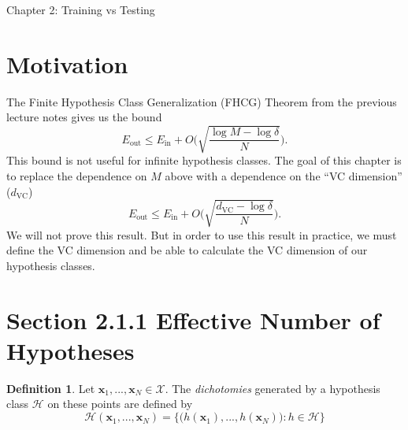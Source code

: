 \documentclass[10pt]{exam}
\theoremstyle{definition}
\newtheorem{defn}{Definition}
\newcommand{\Ein}{E_{\text{in}}}
\newcommand{\Eout}{E_{\text{out}}}
\newcommand{\x}{\mathbf x}
\newcommand{\dvc}{{d_{\text{VC}}}}
\begin{document}
\begin{center}
{
\Huge
Chapter 2: Training vs Testing
}
\end{center}

\begin{center}
\end{center}

\section*{Motivation}

The Finite Hypothesis Class Generalization (FHCG) Theorem from the previous lecture notes gives us the bound
\begin{equation}
    \Eout \le \Ein + O\bigg(\sqrt{\frac{\log M - \log\delta}{N}}\bigg)
    .
\end{equation}
This bound is not useful for infinite hypothesis classes.
The goal of this chapter is to replace the dependence on $M$ above with a dependence on the ``VC dimension'' ($\dvc$)
\begin{equation}
    \Eout \le \Ein + O\bigg(\sqrt{\frac{\dvc - \log\delta}{N}}\bigg)
    .
\end{equation}
We will not prove this result.
But in order to use this result in practice,
we must define the VC dimension and be able to calculate the VC dimension of our hypothesis classes.

\newpage
\section*{Section 2.1.1 Effective Number of Hypotheses}

\begin{defn}
    Let $\x_1,...,\x_N \in \mathcal X$.
    The \emph{dichotomies} generated by a hypothesis class $\mathcal H$ on these points are defined by
    \begin{equation}
        \mathcal H(\x_1, ..., \x_N) = \bigg\{ \big(h(\x_1), ..., h(\x_N)\big) : h \in \mathcal H \bigg\}
    \end{equation}
\end{defn}
\end{document}
